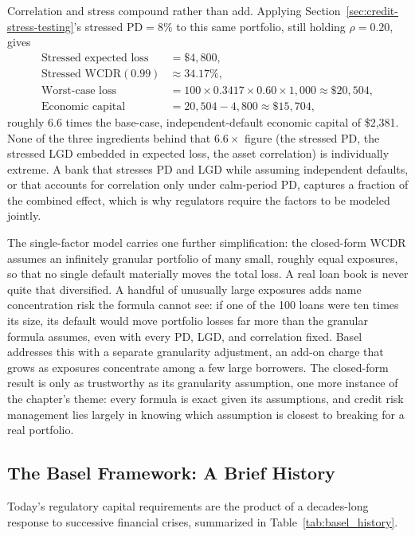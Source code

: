 \documentclass[../ai_in_finance]{subfiles}
\begin{document}
Correlation and stress compound rather than add. Applying Section~\ref{sec:credit-stress-testing}'s stressed $\text{PD}=8\%$ to this same portfolio, still holding $\rho=0.20$, gives
\begin{align*}
\text{Stressed expected loss} &= \$4{,}800, \\
\text{Stressed WCDR}(0.99) &\approx 34.17\%, \\
\text{Worst-case loss} &= 100\times0.3417\times0.60\times1{,}000 \approx \$20{,}504, \\
\text{Economic capital} &= 20{,}504-4{,}800 \approx \$15{,}704,
\end{align*}
roughly $6.6$ times the base-case, independent-default economic capital of \$2,381. None of the three ingredients behind that $6.6\times$ figure (the stressed PD, the stressed LGD embedded in expected loss, the asset correlation) is individually extreme. A bank that stresses PD and LGD while assuming independent defaults, or that accounts for correlation only under calm-period PD, captures a fraction of the combined effect, which is why regulators require the factors to be modeled jointly.

The single-factor model carries one further simplification: the closed-form WCDR assumes an infinitely granular portfolio of many small, roughly equal exposures, so that no single default materially moves the total loss. A real loan book is never quite that diversified. A handful of unusually large exposures adds name concentration risk the formula cannot see: if one of the 100 loans were ten times its size, its default would move portfolio losses far more than the granular formula assumes, even with every PD, LGD, and correlation fixed.
Basel addresses this with a separate granularity adjustment, an add-on charge that grows as exposures concentrate among a few large borrowers. The closed-form result is only as trustworthy as its granularity assumption, one more instance of the chapter's theme: every formula is exact given its assumptions, and credit risk management lies largely in knowing which assumption is closest to breaking for a real portfolio.

\subsection{The Basel Framework: A Brief History}
\label{sec:basel-history}

Today's regulatory capital requirements are the product of a decades-long response to successive financial crises, summarized in Table~\ref{tab:basel_history}.
\end{document}
